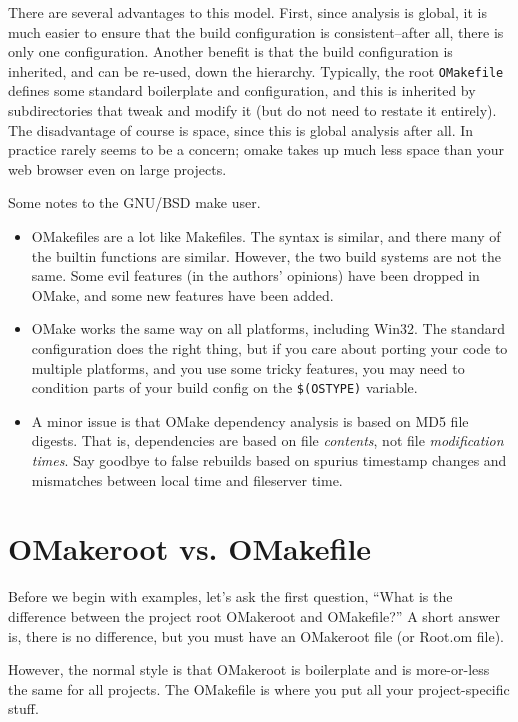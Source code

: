 There are several advantages to this model.  First, since analysis is global, it is much easier to
ensure that the build configuration is consistent--after all, there is only one configuration.
Another benefit is that the build configuration is inherited, and can be re-used, down the
hierarchy.  Typically, the root \verb+OMakefile+ defines some standard boilerplate and
configuration, and this is inherited by subdirectories that tweak and modify it (but do not need to
restate it entirely).  The disadvantage of course is space, since this is global analysis after all.
In practice rarely seems to be a concern; omake takes up much less space than your web browser even
on large projects.

Some notes to the GNU/BSD make user.
\begin{itemize}
\item OMakefiles are a lot like Makefiles.  The syntax is similar, and there many of the builtin
functions are similar.  However, the two build systems are not the same.  Some evil features (in the authors'
opinions) have been dropped in OMake, and some new features have been added.

\item OMake works the same way on all platforms, including Win32.  The standard configuration does
the right thing, but if you care about porting your code to multiple platforms, and you use some
tricky features, you may need to condition parts of your build config on the \verb+$(OSTYPE)+
variable.

\item A minor issue is that OMake dependency analysis is based on MD5 file digests.  That is,
dependencies are based on file \emph{contents}, not file \emph{modification times}.  Say goodbye to
false rebuilds based on spurius timestamp changes and mismatches between local time and fileserver
time.
\end{itemize}

\section{OMakeroot vs. OMakefile}

Before we begin with examples, let's ask the first question, ``What is the difference between the
project root OMakeroot and OMakefile?''  A short answer is, there is no difference, but you must
have an OMakeroot file (or Root.om file).

However, the normal style is that OMakeroot is boilerplate and is more-or-less the same for all
projects.  The OMakefile is where you put all your project-specific stuff.

